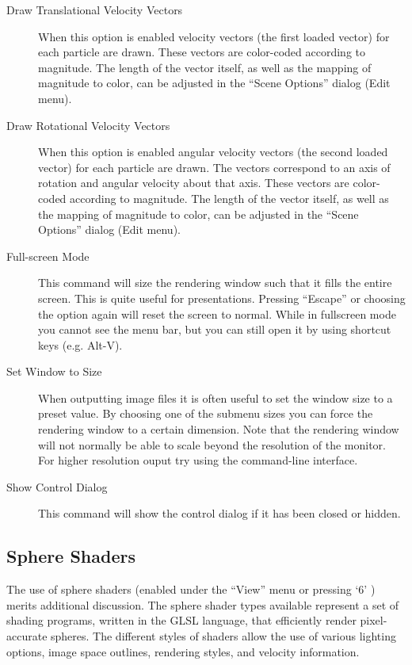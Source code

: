 \begin{description}
\item[Draw Translational Velocity Vectors]
    When this option is enabled velocity vectors (the first loaded vector) for each particle are drawn. These vectors are color-coded according to magnitude. The length of the vector itself, as well as the mapping of magnitude to color, can be adjusted in the ``Scene Options'' dialog (Edit menu).
\item[Draw Rotational Velocity Vectors]
     When this option is enabled angular velocity vectors (the second loaded vector) for each particle are drawn. The vectors correspond to an axis of rotation and angular velocity about that axis. These vectors are color-coded according to magnitude. The length of the vector itself, as well as the mapping of magnitude to color, can be adjusted in the ``Scene Options'' dialog (Edit menu).
\item[Full-screen Mode]
    This command will size the rendering window such that it fills the entire screen. This is quite useful for presentations. Pressing ``Escape'' or choosing the option again will reset the screen to normal. While in fullscreen mode you cannot see the menu bar, but you can still open it by using shortcut keys (e.g. Alt-V).
\item[Set Window to Size]
    When outputting image files it is often useful to set the window size to a preset value. By choosing one of the submenu sizes you can force the rendering window to a certain dimension. Note that the rendering window will not normally be able to scale beyond the resolution of the monitor. For higher resolution ouput try using the command-line interface.
\item[Show Control Dialog]
     This command will show the control dialog if it has been closed or hidden. 
\end{description}

\subsection{Sphere Shaders}
\label{sphereshaders}

The use of sphere shaders (enabled under the ``View'' menu or pressing `6' ) merits additional discussion.  The sphere shader types available represent a set of shading programs, written in the GLSL language, that efficiently render pixel-accurate spheres.  The different styles of shaders allow the use of various lighting options, image space outlines, rendering styles, and velocity information.

